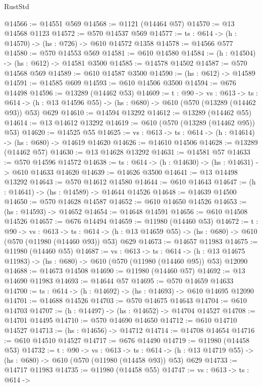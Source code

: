 \begin{lexlean}{RustStd}
\begin{coremodule}
@14566 := @14551 @569
@14568 := @1121 (@14464 @57)
@14570 := @13 @14568 @1123
@14572 := @570 @14537 @569
@14577 := {ts : @614} -> (h : @14570) -> (hs : @726) -> @610 @14572 @1358
@14578 := @14566 @577
@14580 := @570 @14553 @569
@14581 := @610 @14580
@14584 := (h : @14504) -> (hs : @612) -> @14581 @3500
@14585 := @14578 @14502
@14587 := @570 @14568 @569
@14589 := @610 @14587 @3500
@14590 := (hs : @612) -> @14589
@14591 := @14585 @609
@14593 := @610 @14506 @3500
@14594 := @676 @14498
@14596 := @13289 (@14462 @53)
@14609 := {t : @90} ->
  {vs : @613} ->
  {ts : @614} -> (h : @13 @14596 @55) -> (hs : @680) -> @610 (@570 (@13289 (@14462 @93)) @53) @629
@14610 := @14594 @13292
@14612 := @13289 (@14462 @55)
@14614 := @13 @14612 @13292
@14619 := @610 (@570 (@13289 (@14462 @95)) @53)
@14620 := @14525 @55
@14625 := {vs : @613} -> {ts : @614} -> (h : @14614) -> (hs : @680) -> @14619 @14620
@14626 := @14610 @14506
@14628 := @13289 (@14462 @57)
@14630 := @13 @14628 @13292
@14631 := @14581 @57
@14633 := @570 @14596 @14572
@14638 := {ts : @614} -> (h : @14630) -> (hs : @14631) -> @610 @14633 @14620
@14639 := @14626 @3500
@14641 := @13 @14498 @13292
@14643 := @570 @14612 @14580
@14644 := @610 @14643
@14647 := (h : @14641) -> (hs : @14589) -> @14644 @14526
@14648 := @14639 @14500
@14650 := @570 @14628 @14587
@14652 := @610 @14650 @14526
@14653 := (hs : @14593) -> @14652
@14654 := @14648 @14591
@14656 := @610 @14508 @14526
@14657 := @676 @14494
@14659 := @11980 (@14460 @53)
@14672 := {t : @90} ->
  {vs : @613} ->
  {ts : @614} -> (h : @13 @14659 @55) -> (hs : @680) -> @610 (@570 (@11980 (@14460 @93)) @53) @629
@14673 := @14657 @11983
@14675 := @11980 (@14460 @55)
@14687 := {vs : @613} ->
  {ts : @614} ->
  (h : @13 @14675 @11983) -> (hs : @680) -> @610 (@570 (@11980 (@14460 @95)) @53) @12090
@14688 := @14673 @14508
@14690 := @11980 (@14460 @57)
@14692 := @13 @14690 @11983
@14693 := @14644 @57
@14695 := @570 @14659 @14633
@14700 := {ts : @614} -> (h : @14692) -> (hs : @14693) -> @610 @14695 @12090
@14701 := @14688 @14526
@14703 := @570 @14675 @14643
@14704 := @610 @14703
@14707 := (h : @14497) -> (hs : @14652) -> @14704 @14527
@14708 := @14701 @14495
@14710 := @570 @14690 @14650
@14712 := @610 @14710 @14527
@14713 := (hs : @14656) -> @14712
@14714 := @14708 @14654
@14716 := @610 @14510 @14527
@14717 := @676 @14490
@14719 := @11980 (@14458 @53)
@14732 := {t : @90} ->
  {vs : @613} ->
  {ts : @614} -> (h : @13 @14719 @55) -> (hs : @680) -> @610 (@570 (@11980 (@14458 @93)) @53) @629
@14733 := @14717 @11983
@14735 := @11980 (@14458 @55)
@14747 := {vs : @613} ->
  {ts : @614} ->

\end{coremodule}
\end{lexlean}

